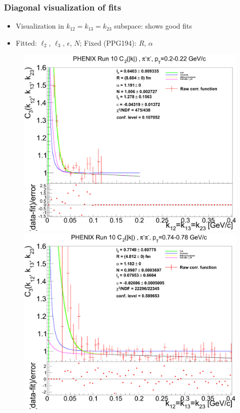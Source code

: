\documentclass{beamer}
\begin{document}
\begin{frame}
\frametitle{Diagonal visualization of fits}
\begin{itemize}
\setlength{\itemsep}{10pt}
\item Visualization in $k_{12}=k_{13}=k_{23}$ subspace:  shows good fits
\item Fitted: $\ell_2$, $\ell_3$, $\epsilon$, $N$; Fixed (PPG194): $R$, $\alpha$
\end{itemize}
\begin{figure}
\includegraphics[scale=0.13]{pic/C_icharge0_pt2}
\includegraphics[scale=0.13]{pic/C_icharge0_pt29}

\end{figure}
\end{frame}
\end{document}

